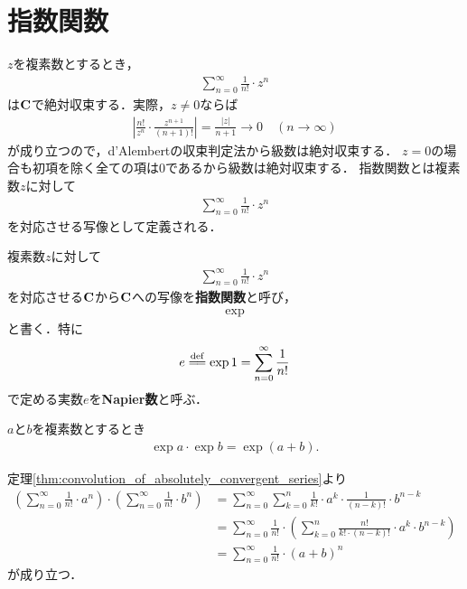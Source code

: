 \section{指数関数}
	
	$z$を複素数とするとき，
	\begin{align}
		\sum_{n=0}^\infty \frac{1}{n!} \cdot z^n
	\end{align}
	は$\mathbf{C}$で絶対収束する．実際，$z \neq 0$ならば
	\begin{align}
		\left|\frac{n!}{z^n} \cdot \frac{z^{n+1}}{(n+1)!}\right|
		= \frac{|z|}{n+1}
		\longrightarrow 0\quad (n \longrightarrow \infty)
	\end{align}
	が成り立つので，d'Alembertの収束判定法から級数は絶対収束する．
	$z=0$の場合も初項を除く全ての項は$0$であるから級数は絶対収束する．
	指数関数とは複素数$z$に対して
	\begin{align}
		\sum_{n = 0}^\infty \frac{1}{n!} \cdot z^n
	\end{align}
	を対応させる写像として定義される．
	
	\begin{screen}
		\begin{dfn}[指数関数]
			複素数$z$に対して
			\begin{align}
				\sum_{n=0}^\infty \frac{1}{n!} \cdot z^n
			\end{align}
			を対応させる$\mathbf{C}$から$\mathbf{C}$への写像を{\bf 指数関数}と呼び，
			\begin{align}
				\exp
			\end{align}
			と書く．特に
			\begin{align}
				e \defeq \exp{1} = \sum_{n=0}^\infty \frac{1}{n!}
			\end{align}
			で定める実数$e$を{\bf Napier数}と呼ぶ．
		\end{dfn}
	\end{screen}
	
	\begin{screen}
		\begin{thm}[指数法則]\label{thm:law_of_exponentiation_for_exponential_function}
			$a$と$b$を複素数とするとき
			\begin{align}
				\exp{a} \cdot \exp{b} = \exp{(a + b)}.
			\end{align}
		\end{thm}
	\end{screen}
	
	\begin{sketch}
		定理\ref{thm:convolution_of_absolutely_convergent_series}より
		\begin{align}
			\left(\sum_{n=0}^\infty \frac{1}{n!} \cdot a^n\right) \cdot \left(\sum_{n=0}^\infty \frac{1}{n!} \cdot b^n\right)
			&= \sum_{n=0}^\infty \sum_{k=0}^n \frac{1}{k!} \cdot a^k \cdot \frac{1}{(n-k)!} \cdot b^{n-k} \\
			&= \sum_{n=0}^\infty \frac{1}{n!} \cdot \left( \sum_{k=0}^n \frac{n!}{k! \cdot (n-k)!} \cdot a^k \cdot b^{n-k} \right) \\
			&= \sum_{n=0}^\infty \frac{1}{n!} \cdot (a+b)^n
		\end{align}
		が成り立つ．
		\QED
	\end{sketch}
	

